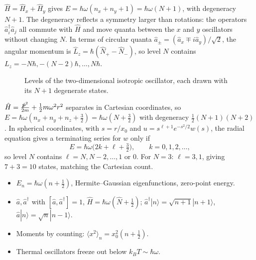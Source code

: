 \begin{example}
$\hat{H} = \hat{H}_x + \hat{H}_y$ gives $E = \hbar\omega(n_x+n_y+1) = \hbar\omega(N+1)$, with degeneracy $N+1$. The degeneracy reflects a symmetry larger than rotations: the operators $\hat{a}_i^\dagger\hat{a}_j$ all commute with $\hat{H}$ and move quanta between the $x$ and $y$ oscillators without changing $N$. In terms of circular quanta $\hat{a}_\pm = (\hat{a}_x\mp i\hat{a}_y)/\sqrt2$, the angular momentum is $\hat{L}_z = \hbar(\hat{N}_+ - \hat{N}_-)$, so level $N$ contains $L_z = -N\hbar,-(N-2)\hbar,\ldots,N\hbar$.
\end{example}

\begin{figure}[ht]
\centering
{}
\caption{Levels of the two-dimensional isotropic oscillator, each drawn with its $N+1$ degenerate states.}
\end{figure}

\begin{example}
$\hat{H} = \frac{\hat{\bm{p}}^2}{2m} + \frac12m\omega^2r^2$ separates in Cartesian coordinates, so $E = \hbar\omega(n_x+n_y+n_z+\frac32) = \hbar\omega(N+\frac32)$ with degeneracy $\frac12(N+1)(N+2)$. In spherical coordinates, with $s = r/x_0$ and $u = s^{\ell+1}e^{-s^2/2}w(s)$, the radial equation gives a terminating series for $w$ only if
\[
    E = \hbar\omega\bigl(2k+\ell+\tfrac32\bigr),
    \qquad
    k = 0,1,2,\ldots,
\]
so level $N$ contains $\ell = N, N-2,\ldots,1$ or $0$. For $N = 3$: $\ell = 3,1$, giving $7+3 = 10$ states, matching the Cartesian count.
\end{example}

\begin{fact}
\leavevmode
\begin{itemize}
\item $E_n = \hbar\omega(n+\frac12)$, Hermite--Gaussian eigenfunctions, zero-point energy.
\item $\hat{a},\hat{a}^\dagger$ with $[\hat{a},\hat{a}^\dagger] = 1$, $\hat{H} = \hbar\omega(\hat{N}+\frac12)$; $\hat{a}^\dagger|n\rangle = \sqrt{n+1}|n+1\rangle$, $\hat{a}|n\rangle = \sqrt n|n-1\rangle$.
\item Moments by counting: $\langle x^2\rangle_n = x_0^2(n+\frac12)$.
\item Thermal oscillators freeze out below $k_BT\sim\hbar\omega$.
\end{itemize}
\end{fact}
